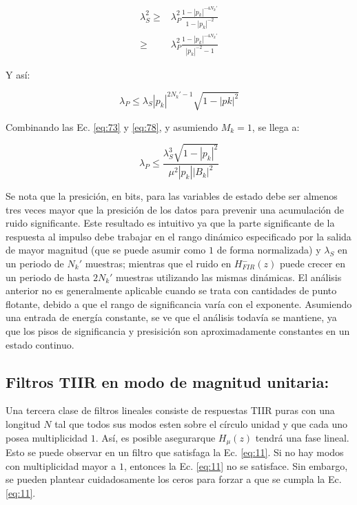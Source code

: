 \documentclass[conference]{IEEEtran}
\begin{document}
\begin{align}
    \lambda_S^2 \geq & \lambda_P^2 \frac{1-|p_k|^{-4N_k'}}{1-|p_k|^{-2}}\\
                \geq & \lambda_P^2 \frac{1-|p_k|^{-4N_k'}}{|p_k|^{-2}-1}
\end{align}

Y así:

\begin{equation}
    \lambda_P \leq \lambda_S |p_k|^{2N_k' - 1} \sqrt{1-|pk|^2}
    \label{eq:78}
\end{equation}

Combinando las Ec. \ref{eq:73} y \ref{eq:78}, y asumiendo \(M_k = 1\), se llega a:

\begin{equation}
    \lambda_P \leq \frac{\lambda_S^3 \sqrt{1-|p_k|^2}}{\mu^2 |p_k| |B_k|^2}
\end{equation}

Se nota que la presición, en bits, para las variables de estado debe ser almenos tres veces mayor que la presición de los datos para prevenir una acumulación de ruido significante. Este resultado es intuitivo ya que la parte significante de la respuesta al impulso debe trabajar en el rango dinámico especificado por la salida de mayor magnitud (que se puede asumir como \(1\) de forma normalizada) y \(\lambda_S\) en un periodo de \(N_k'\) muestras; mientras que el ruido en \(H_{FIR}^{-}(z)\) puede crecer en un periodo de hasta \(2N_k'\) muestras utilizando las mismas dinámicas. El análisis anterior no es generalmente aplicable cuando se trata con cantidades de punto flotante, debido a que el rango de significancia varía con el exponente. Asumiendo una entrada de energía constante, se ve que el análisis todavía se mantiene, ya que los pisos de significancia y presisición son aproximadamente constantes en un estado continuo.

\subsection{Filtros TIIR en modo de magnitud unitaria:}
\label{sec:org301bf9b}

Una tercera clase de filtros lineales consiste de respuestas TIIR puras con una longitud \(N\) tal que todos sus modos esten sobre el círculo unidad y que cada uno posea multiplicidad \(1\). Así, es posible asegurarque \(H_{\mu}(z)\) tendrá una fase lineal. Esto se puede observar en un filtro que satisfaga la Ec. \ref{eq:11}. Si no hay modos con multiplicidad mayor a \(1\), entonces la Ec. \ref{eq:11} no se satisface. Sin embargo, se pueden plantear cuidadosamente los ceros para forzar a que se cumpla la Ec. \ref{eq:11}.
\end{document}
